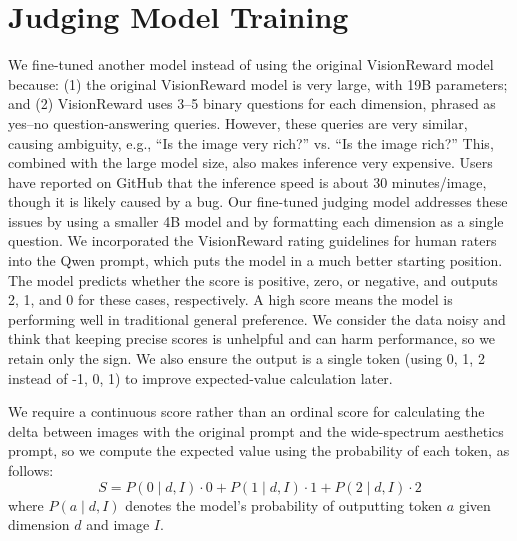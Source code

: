 \section{Judging Model Training}
We fine-tuned another model instead of using the original VisionReward model because: (1) the original VisionReward model is very large, with 19B parameters; and (2) VisionReward uses 3--5 binary questions for each dimension, phrased as yes--no question-answering queries. However, these queries are very similar, causing ambiguity, e.g., ``Is the image very rich?'' vs. ``Is the image rich?'' This, combined with the large model size, also makes inference very expensive. Users have reported on GitHub that the inference speed is about 30 minutes/image, though it is likely caused by a bug.
Our fine-tuned judging model addresses these issues by using a smaller 4B model and by formatting each dimension as a single question. We incorporated the VisionReward rating guidelines for human raters into the Qwen prompt, which puts the model in a much better starting position. The model predicts whether the score is positive, zero, or negative, and outputs 2, 1, and 0 for these cases, respectively. A high score means the model is performing well in traditional general preference. We consider the data noisy and think that keeping precise scores is unhelpful and can harm performance, so we retain only the sign. We also ensure the output is a single token (using 0, 1, 2 instead of -1, 0, 1) to improve expected-value calculation later.

We require a continuous score rather than an ordinal score for calculating the delta between images with the original prompt and the wide-spectrum aesthetics prompt, so we compute the expected value using the probability of each token, as follows:
\begin{equation}
    S = P(0 \mid d,I) \cdot 0 + P(1 \mid d,I) \cdot 1 + P(2 \mid d,I) \cdot 2
\end{equation}
where $P(a \mid d,I)$ denotes the model's probability of outputting token $a$ given dimension $d$ and image $I$.

